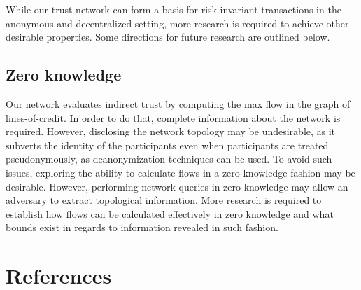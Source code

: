 \documentclass[11pt]{article}
\theoremstyle{definition}
\theoremstyle{corollary}
\theoremstyle{lemma}
\begin{document}
  While our trust network can form a basis for risk-invariant transactions in
  the anonymous and decentralized setting, more research is required to achieve
  other desirable properties. Some directions for future research are outlined
  below.

  \subsection{Zero knowledge}

  Our network evaluates indirect trust by computing the max flow in the graph
  of lines-of-credit. In order to do that, complete information about the
  network is required. However, disclosing the network topology may be
  undesirable, as it subverts the identity of the participants even when
  participants are treated pseudonymously, as deanonymization techniques can be
  used. To avoid such issues, exploring the ability to calculate flows in a
  zero knowledge fashion may be desirable. However, performing network queries
  in zero knowledge may allow an adversary to extract topological information.
  More research is required to establish how flows can be calculated
  effectively in zero knowledge and what bounds exist in regards to information
  revealed in such fashion.

  \section{References}
\end{document}
